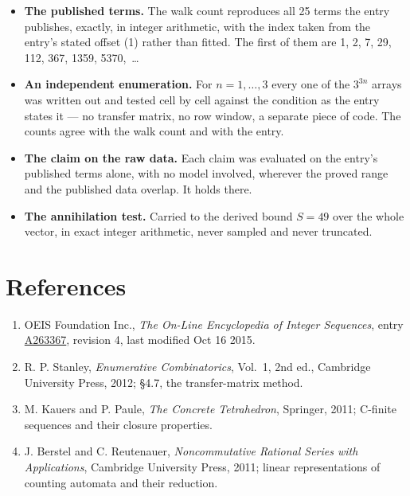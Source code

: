 \documentclass[11pt]{article}
\theoremstyle{definition}
\begin{document}
\begin{itemize}

\item {\bfseries The published terms.} The walk count reproduces all 25 terms the entry publishes, exactly, in integer arithmetic, with the index taken from the entry's stated offset (1) rather than fitted. The first of them are 1, 2, 7, 29, 112, 367, 1359, 5370,~\dots

\item {\bfseries An independent enumeration.} For $n = 1,\dots,3$ every one of the $3^{3n}$ arrays was written out and tested cell by cell against the condition as the entry states it --- no transfer matrix, no row window, a separate piece of code. The counts agree with the walk count and with the entry.

\item {\bfseries The claim on the raw data.} Each claim was evaluated on the entry's published terms alone, with no model involved, wherever the proved range and the published data overlap. It holds there.

\item {\bfseries The annihilation test.} Carried to the derived bound $S = 49$ over the whole vector, in exact integer arithmetic, never sampled and never truncated.

\end{itemize}

\section{References}

\begin{enumerate}

\item OEIS Foundation Inc., \emph{The On-Line Encyclopedia of Integer Sequences}, entry \href{https://oeis.org/A263367}{A263367}, revision 4, last modified Oct 16 2015.

\item R. P. Stanley, \emph{Enumerative Combinatorics}, Vol.~1, 2nd ed., Cambridge University Press, 2012; \S4.7, the transfer-matrix method.

\item M. Kauers and P. Paule, \emph{The Concrete Tetrahedron}, Springer, 2011; C-finite sequences and their closure properties.

\item J. Berstel and C. Reutenauer, \emph{Noncommutative Rational Series with Applications}, Cambridge University Press, 2011; linear representations of counting automata and their reduction.

\end{enumerate}
\end{document}
